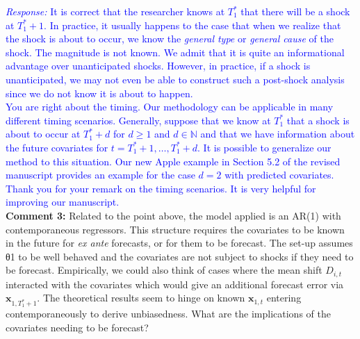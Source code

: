 \documentclass[12pt]{article}
\newcommand{\response}[1]{\noindent \textcolor{blue}{\emph{Response:} #1}}
\begin{document}
{\response{It is correct that the researcher knows at $T_1^*$ that there will be a shock at $T_1^* + 1$. In practice, it usually happens to the case that when we realize that the shock is about to occur, we  know the \emph{general type}  or \emph{general cause} of the shock. The magnitude is not known. 
We admit that it is quite an informational advantage over unanticipated shocks. However, in practice, if a shock is unanticipated, we may not even be able to construct such a post-shock analysis since we do not know it is about to happen.\\

You are right about the timing. Our methodology can be applicable in many different timing scenarios. Generally, suppose that we know at $T_1^*$ that a shock is about to occur at $T_1^* + d$ for $d\geq 1$ and $d\in \mathbb{N}$ and that we have information about the future covariates for $t = T_1^* +1 , \ldots, T_1^* + d$. It is possible to generalize our method to this situation. Our new Apple example in Section 5.2 of the revised manuscript provides an example for the case $d=2$ with predicted covariates. \\

Thank you for your remark on the timing scenarios. It is very helpful for improving our manuscript.} \\

{\bf Comment 3:} Related to the point above, the model applied is an AR(1) with contemporaneous regressors. This structure requires the covariates to be known in the future for \emph{ex ante} forecasts, or for them to be forecast. The set-up assumes θ1 to be well behaved and the covariates are not subject to shocks if they need to be forecast. Empirically, we could also think of cases where the mean shift $D_{i,t}$ interacted with the covariates which would give an additional forecast error via $\mathbf{x}_{1, T_1^* + 1}$. The theoretical results seem to hinge on known $\mathbf{x}_{1,t}$ entering contemporaneously to derive unbiasedness. What are the implications of the covariates needing to be forecast? \\

}
\end{document}
